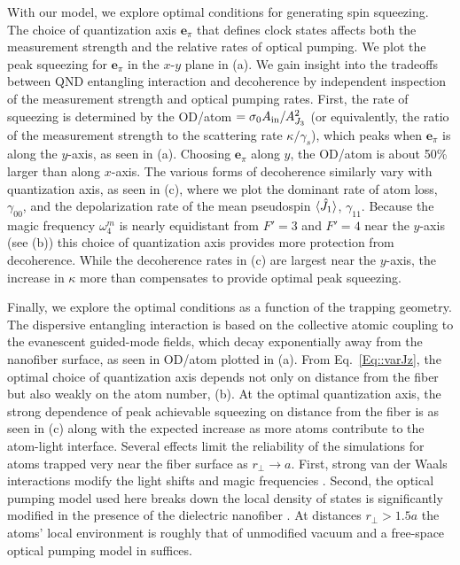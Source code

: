 \documentclass[preprint, aps,pra,onecolumn]{revtex4-1} %
\newcommand{\jx}{\hat{J}_1}
\newcommand{\qaxis}{\mathbf{e}_\pi}
\newcommand{\magic}[1]{\omega_{#1}^m}
\newcommand{\comment}[1]{{\color{Maroon} #1}}
\begin{document}
With our model, we explore optimal conditions for generating spin squeezing.  
The choice of quantization axis $\qaxis$ that defines clock states affects both the measurement strength and the relative rates of optical pumping. 
We plot the peak squeezing for $\qaxis$ in the $x$-$y$ plane in (a). 
We gain insight into the tradeoffs between QND entangling interaction and decoherence by independent inspection of the measurement strength and optical pumping rates.  
First, the rate of squeezing is determined by the OD/atom $=\sigma_0 A_{\rm in}/A_{J_3}^2$ (or equivalently, the ratio of the measurement strength to the scattering rate $\kappa/\gamma_s$), which peaks when $\qaxis$ is along the $y$-axis, as seen in (a). 
Choosing $\qaxis$ along $y$, the OD/atom is about 50\% larger than along $x$-axis.  
The various forms of decoherence similarly vary with quantization axis, as seen in (c), where we plot the dominant rate of atom loss, $\gamma_{00}$, and the depolarization rate of the mean pseudospin $\expt{\jx}$, $\gamma_{11}$. 
Because the magic frequency $\magic{4}$ is nearly equidistant from $F'=3$ and $F'=4$ near the $y$-axis (see (b)) this choice of quantization axis provides more protection from decoherence.   
While the decoherence rates in (c) are largest near the $y$-axis, the increase in $\kappa$ more than compensates to provide optimal peak squeezing.

Finally, we explore the optimal conditions as a function of the trapping geometry.  
The dispersive entangling interaction is based on the collective atomic coupling to the evanescent guided-mode fields, which decay exponentially away from the nanofiber surface, as seen in OD/atom plotted in (a). 
From Eq.~\eqref{Eq::varJz}, the optimal choice of quantization axis depends not only on distance from the fiber but also weakly on the atom number, (b).  
At the optimal quantization axis, the strong dependence of peak achievable squeezing on distance from the fiber is as seen in (c) along with the expected increase as more atoms contribute to the atom-light interface.  
Several effects limit the reliability of the simulations for atoms trapped very near the fiber surface as $r_\perp \rightarrow a$. 
First, strong van der Waals interactions modify the light shifts and magic frequencies \cite{vetsch thesis, lacroute_state-insensitive_2012}.  
Second, the optical pumping model used here breaks down the local density of states is significantly modified in the presence of the dielectric nanofiber \cite{le_kien_spontaneous_2005}. 
At distances \comment{$r_\perp > 1.5a$} the atoms' local environment is roughly that of unmodified vacuum \cite{le_kien_spontaneous_2005} and a free-space optical pumping model in  suffices. 
\end{document}
